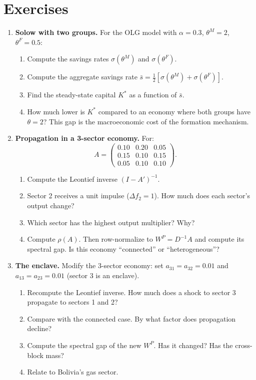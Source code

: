 \documentclass[../structural_economics_book.tex]{subfiles}
\begin{document}
\section{Exercises}
\label{ch03:sec:exercises}

\begin{enumerate}[label=\textbf{3.\arabic*}, leftmargin=3em]

\item \textbf{Solow with two groups.} For the OLG model with $\alpha = 0.3$, $\theta^M = 2$, $\theta^F = 0.5$:
\begin{enumerate}
\item Compute the savings rates $\sigma(\theta^M)$ and $\sigma(\theta^F)$.
\item Compute the aggregate savings rate $\bar{s} = \frac{1}{2}[\sigma(\theta^M) + \sigma(\theta^F)]$.
\item Find the steady-state capital $K^*$ as a function of $\bar{s}$.
\item How much lower is $K^*$ compared to an economy where both groups have $\theta = 2$? This gap is the macroeconomic cost of the formation mechanism.
\end{enumerate}

\item \textbf{Propagation in a 3-sector economy.} For:
\begin{equation}
A = \begin{pmatrix} 0.10 & 0.20 & 0.05 \\ 0.15 & 0.10 & 0.15 \\ 0.05 & 0.10 & 0.10 \end{pmatrix}.
\end{equation}
\begin{enumerate}
\item Compute the Leontief inverse $(I - A')^{-1}$.
\item Sector 2 receives a unit impulse ($\Delta f_2 = 1$). How much does each sector's output change?
\item Which sector has the highest output multiplier? Why?
\item Compute $\rho(A)$. Then row-normalize to $W^P = D^{-1}A$ and compute its spectral gap. Is this economy ``connected'' or ``heterogeneous''?
\end{enumerate}

\item \textbf{The enclave.} Modify the 3-sector economy: set $a_{31} = a_{32} = 0.01$ and $a_{13} = a_{23} = 0.01$ (sector 3 is an enclave).
\begin{enumerate}
\item Recompute the Leontief inverse. How much does a shock to sector 3 propagate to sectors 1 and 2?
\item Compare with the connected case. By what factor does propagation decline?
\item Compute the spectral gap of the new $W^P$. Has it changed? Has the cross-block mass?
\item Relate to Bolivia's gas sector.
\end{enumerate}


\end{enumerate}
\end{document}
